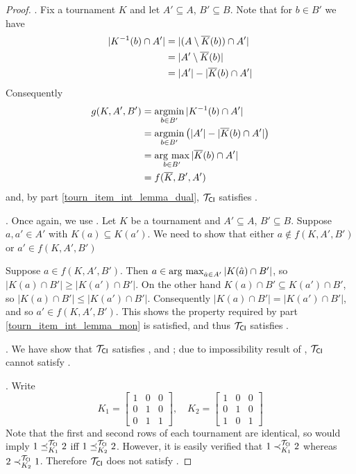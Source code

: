 \begin{proof}
    \dualaxiom{}. Fix a tournament $K$ and let $A' \subseteq A$, $B'
    \subseteq B$. Note that for $b \in B'$ we have
    \begin{align*}
        |K^{-1}(b) \cap A'|
        &= |(A \setminus {\overline{K}}(b)) \cap A'| \\
        &= |A' \setminus {\overline{K}}(b)| \\
        &= |A'| - |{\overline{K}}(b) \cap A'|
    \end{align*}
    Consequently
    \begin{align*}
        g(K, A', B')
        &= \argmin_{b \in B'}{|K^{-1}(b) \cap A'|} \\
        &= \argmin_{b \in B'}{\left(|A'| - |\dual{K}(b) \cap A'|\right)} \\
        &= \argmax_{b \in B'}{|\dual{K}(b) \cap A'|} \\
        &= f(\dual{K}, B', A')
    \end{align*}
    and, by  part
    \cref{tourn_item_int_lemma_dual}, ${\mathcal{T}_{\mathsf{CI}}}$ satisfies
    \dualaxiom{}.

    \mon{}. Once again, we use
    .  Let $K$ be a tournament and $A'
    \subseteq A$, $B' \subseteq B$. Suppose $a, a' \in A'$ with $K(a) \subseteq
    K(a')$. We need to show that either $a \not\in f(K, A', B')$ or $a' \in
    f(K, A', B')$

    Suppose $a \in f(K, A', B')$. Then $a \in \operatorname*{arg\ max}_{\hat{a} \in
    A'}{|K(\hat{a}) \cap B'|}$, so $|K(a) \cap B'| \ge |K(a') \cap B'|$. On the
    other hand $K(a) \cap B' \subseteq K(a') \cap B'$, so $|K(a) \cap B'| \le
    |K(a') \cap B'|$.  Consequently $|K(a) \cap B'| = |K(a') \cap B'|$, and so
    $a' \in f(K, A', B')$. This shows the property required by
     part
    \cref{tourn_item_int_lemma_mon} is satisfied, and thus ${\mathcal{T}_{\mathsf{CI}}}$
    satisfies \mon{}.

    \posresp{}. We have show that ${\mathcal{T}_{\mathsf{CI}}}$ satisfies
    \chaindef{}, \anon{} and \dualaxiom{}; due to
    impossibility result of , ${\mathcal{T}_{\mathsf{CI}}}$
    cannot satisfy \posresp{}.

    \iim{}. Write
    \[
        K_1 = \begin{bmatrix}
            1 & 0 & 0 \\
            0 & 1 & 0 \\
            0 & 1 & 1
        \end{bmatrix}
        , \quad
        K_2 = \begin{bmatrix}
            1 & 0 & 0 \\
            0 & 1 & 0 \\
            1 & 0 & 1
        \end{bmatrix}
    \]
    Note that the first and second rows of each tournament are identical, so
    \iim{} would imply $1 \preceq_{K_1}^{\mathcal{T}_{\mathsf{CI}}} 2$ iff $1
    \preceq_{K_2}^{\mathcal{T}_{\mathsf{CI}}} 2$.  However, it is easily verified that $1
    \prec_{K_1}^{\mathcal{T}_{\mathsf{CI}}} 2$ whereas $2 \prec_{K_2}^{\mathcal{T}_{\mathsf{CI}}} 1$. Therefore
    ${\mathcal{T}_{\mathsf{CI}}}$ does not satisfy \iim{}.
\end{proof}
